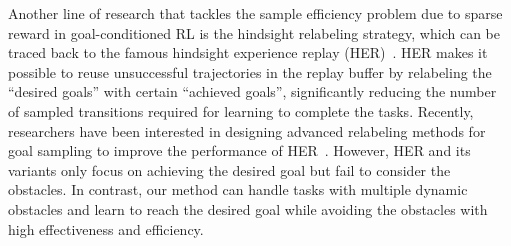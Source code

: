 \documentclass[journal]{IEEEtran}
\begin{document}
Another line of research that tackles the sample efficiency problem due to sparse reward in goal-conditioned RL is the hindsight relabeling strategy, which can be traced back to the famous hindsight experience replay (HER)~\citep{andrychowicz2017hindsight}.
HER makes it possible to reuse unsuccessful trajectories in the replay buffer by relabeling the ``desired goals'' with certain ``achieved goals'', significantly reducing the number of sampled transitions required for learning to complete the tasks.
Recently, researchers have been interested in designing advanced relabeling methods for goal sampling to improve the performance of HER~\citep{ding2019goal, zhang2020automatic, mccarthy2021imaginary, fang2019curriculum, pitis2020maximum, kuang2020goal}.
However, HER and its variants only focus on achieving the desired goal but fail to consider the obstacles. In contrast, our method can handle tasks with multiple dynamic obstacles and learn to reach the desired goal while avoiding the obstacles with high effectiveness and efficiency.
\end{document}
